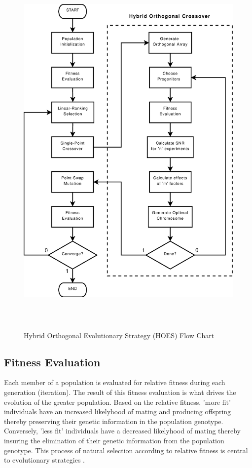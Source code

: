 \begin{figure}[htbp]
\centering
\includegraphics[height=7.5in]{./working_figures/HOES_flow.eps}
\caption{Hybrid Orthogonal Evolutionary Strategy (HOES) Flow Chart}
\label{fig:HOES_flow_chart}
\end{figure}





\subsection{Fitness Evaluation}
Each member of a population is evaluated for relative fitness during each generation 
(iteration). The result of this fitness evaluation is what drives the evolution of the
greater population. Based on the relative fitness, 'more fit' individuals have an
increased likelyhood of mating and producing offspring thereby preserving their genetic
information in the population genotype. Conversely, 'less fit' individuals have a
decreased likelyhood of mating thereby insuring the elimination of their genetic
information from the population genotype. This process of natural selection according to
relative fitness is central to evolutionary strategies \cite{darwin_origin_2001}.

